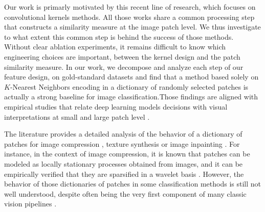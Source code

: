 \documentclass{article}
\newcommand{\mynotes}[1]{\textcolor{red}{#1}}
\begin{document}
Our work is primarly motivated by this recent line of research, which focuses on convolutional kernels methods.  All those works  share a common processing step that constructs a similarity measure at the image patch level. We thus investigate to what extent this common step is behind the success of those methods. 
Without clear ablation experiments, it remains difficult to know which  engineering choices are important, between the kernel design and the patch similarity measure. 
In our work, we decompose and analyze each step of our feature design, on gold-standard  datasets and find that a method based solely on $K$-Nearest Neighbors encoding in a dictionary of randomly selected patches is actually a strong baseline for image classification.Those findings are aligned with  empirical studies that relate deep learning models decisions with visual interpretations at small and large patch level
\citep{zeiler2014visualizing,brendel2019approximating}.

The literature provides a detailed analysis of the behavior of a dictionary of patches for image compression
\citep{wallace1992jpeg}, texture synthesis \citep{efros1999texture} or image inpainting \citep{criminisi2004region}. 
For instance, in the context of image compression, it is known that patches can be modeled as locally stationary processes obtained from images, and it can be empirically verified that they are sparsified in a wavelet basis \citep{mallat1999wavelet}. However, the behavior of those dictionaries of patches in some classification methods is still not well understood, despite often being the very first component of many classic vision pipelines \citep{perronnin2010improving,lowe2004distinctive,brendel2019approximating,oyallon2018scattering}.

 
\end{document}
